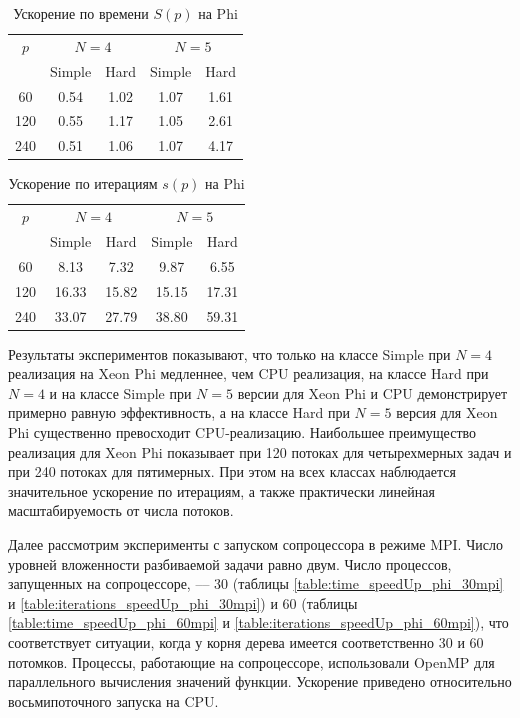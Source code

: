 \begin{table}
    \centering
    \begin{tabular}{|c|c|c|c|c|}
    \hline
    \(p\) & \multicolumn{2}{|c|}{\(N=4\)} & \multicolumn{2}{|c|}{\(N=5\)}\\ \cline{2-5}
    & Simple & Hard & Simple & Hard \\ \hline
	60 & 0.54 & 1.02 & 1.07 & 1.61\\ \hline
	120 & 0.55 & 1.17 & 1.05 & 2.61\\ \hline
	240 & 0.51 & 1.06 & 1.07 & 4.17\\ \hline
    \end{tabular}
    \caption{Ускорение по времени \(S(p)\) на Phi}
    \label{table:time_speedUp_phi}
\end{table}
\begin{table}
    \centering
    \begin{tabular}{|c|c|c|c|c|}
    \hline
    \(p\) & \multicolumn{2}{|c|}{\(N=4\)} & \multicolumn{2}{|c|}{\(N=5\)}\\ \cline{2-5}
    & Simple & Hard & Simple & Hard \\ \hline
	60 & 8.13 & 7.32 & 9.87 & 6.55 \\ \hline
	120 & 16.33 & 15.82 & 15.15 & 17.31 \\ \hline
	240 & 33.07 & 27.79 & 38.80 & 59.31 \\ \hline
    \end{tabular}
    \caption{Ускорение по итерациям \(s(p)\) на Phi}
    \label{table:iterations_speedUp_phi}
\end{table}
\par
Результаты экспериментов показывают, что только на классе Simple при \(N=4\) реализация на Xeon Phi медленнее, чем CPU реализация, на классе Hard при \(N=4\) и на классе Simple при \(N=5\) версии для Xeon Phi и CPU демонстрирует примерно равную эффективность, а на классе Hard при \(N=5\) версия для Xeon Phi существенно превосходит CPU-реализацию. Наибольшее преимущество реализация для Xeon Phi показывает при 120 потоках для четырехмерных задач и при 240 потоках для пятимерных. При этом на всех классах наблюдается значительное ускорение по итерациям, а также практически линейная масштабируемость от числа потоков.
\par
Далее рассмотрим эксперименты с запуском сопроцессора в режиме MPI. Число уровней вложенности разбиваемой задачи равно двум. Число процессов, запущенных на сопроцессоре, –-- 30 (таблицы \ref{table:time_speedUp_phi_30mpi} и \ref{table:iterations_speedUp_phi_30mpi}) и 60 (таблицы \ref{table:time_speedUp_phi_60mpi} и \ref{table:iterations_speedUp_phi_60mpi}), что соответствует ситуации, когда у корня дерева имеется соответственно 30 и 60 потомков. Процессы, работающие на сопроцессоре, использовали OpenMP для параллельного вычисления значений функции. Ускорение приведено относительно восьмипоточного запуска на CPU.
